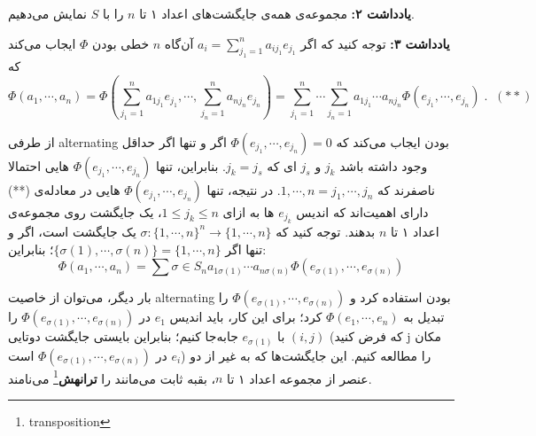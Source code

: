 		
		\textbf{یادداشت ۲:}
		مجموعه‌ی همه‌ی جایگشت‌های اعداد ۱ تا $n$ را با $S$ نمایش می‌دهیم.

\textbf{یادداشت ۳:}
توجه کنید که اگر
$a_i = \sum_{j_1=1}^n a_{ij_1} e_{j_1} $
آن‌گاه $n$ خطی بودن $\Phi$ ایجاب می‌کند که
$$ \Phi(a_1 , \cdots , a_n) = \Phi(\sum_{j_1=1}^n a_{1j_1} e_{j_1} , \cdots , \sum_{j_n=1}^n a_{nj_n} e_{j_n})
=
\sum_{j_1=1}^n \cdots \sum_{j_n=1}^n a_{1j_1} \cdots a_{nj_n} \Phi(e_{j_1} , \cdots , e_{j_n}) \; . \; \; (**)
$$

از طرفی alternating بودن ایجاب می‌کند که
$ \Phi(e_{j_1} , \cdots , e_{j_n}) = 0$
اگر و تنها اگر حداقل وجود داشته باشد $j_k$ و $j_s$ ای که $j_k=j_s$. بنابراین، تنها
$ \Phi(e_{j_1} , \cdots , e_{j_n})$
هایی احتمالا ناصفرند که
${1,\cdots,n} = {j_1,\cdots,j_n} $.
در نتیجه، تنها
$ \Phi(e_{j_1} , \cdots , e_{j_n})$
هایی در معادله‌ی (**) دارای اهمیت‌اند که اندیس $e_{j_k}$ ها به ازای $1 \leq j_k \leq n$، یک جایگشت روی مجموعه‌ی اعداد ۱ تا $n$ بدهند. توجه کنید که
$\sigma: \{1,\cdots,n\}^n \to \{1,\cdots,n\}$
یک جایگشت است، اگر و تنها اگر
$\{\sigma(1),\cdots,\sigma(n)\} = \{1,\cdots,n\}$؛
بنابراین:
$$\Phi(a_1 , \cdots , a_n) = \sum{\sigma \in S_n} a_{1 \sigma(1)} \cdots a_{n \sigma(n)} \Phi(e_{\sigma(1)} , \cdots , e_{\sigma(n)}) $$

بار دیگر، می‌توان از خاصیت alternating بودن استفاده کرد و 
$\Phi(e_{\sigma(1)} , \cdots , e_{\sigma(n)})$
را تبدیل به
$ \Phi(e_1 , \cdots , e_n) $
کرد؛ برای این کار، باید اندیس $e_1$ در $\Phi(e_{\sigma(1)} , \cdots , e_{\sigma(n)})$ را با $e_{\sigma(1)}$ جا‌به‌جا کنیم؛ بنابراین بایستی جایگشت دوتایی
$(i,j)$
(که فرض کنید j مکان $e_i$ در 
$\Phi(e_{\sigma(1)} , \cdots , e_{\sigma(n)})$
است) را مطالعه کنیم. این جایگشت‌ها که به غیر از دو عنصر از مجموعه اعداد ۱ تا $n$، بقبه ثابت می‌مانند را \textbf{ترانهش}\footnote{transposition} می‌نامند.



